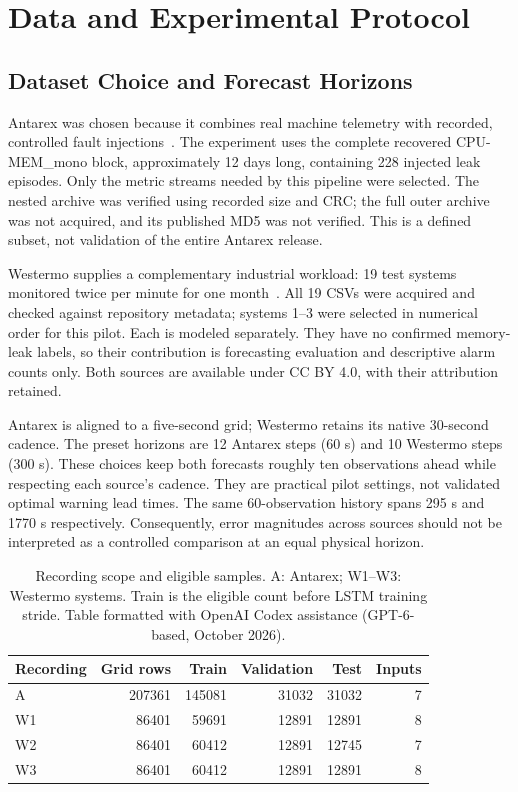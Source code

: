 \documentclass{llncs}
\begin{document}
\section{Data and Experimental Protocol}
\subsection{Dataset Choice and Forecast Horizons}
Antarex was chosen because it combines real machine telemetry with recorded, controlled fault injections~\cite{ref3,ref4,ref5}. The experiment uses the complete recovered CPU-MEM\_mono block, approximately 12 days long, containing 228 injected leak episodes. Only the metric streams needed by this pipeline were selected. The nested archive was verified using recorded size and CRC; the full outer archive was not acquired, and its published MD5 was not verified. This is a defined subset, not validation of the entire Antarex release.

Westermo supplies a complementary industrial workload: 19 test systems monitored twice per minute for one month~\cite{ref6}. All 19 CSVs were acquired and checked against repository metadata; systems 1--3 were selected in numerical order for this pilot. Each is modeled separately. They have no confirmed memory-leak labels, so their contribution is forecasting evaluation and descriptive alarm counts only. Both sources are available under CC BY 4.0, with their attribution retained.

Antarex is aligned to a five-second grid; Westermo retains its native 30-second cadence. The preset horizons are 12 Antarex steps (60 s) and 10 Westermo steps (300 s). These choices keep both forecasts roughly ten observations ahead while respecting each source's cadence. They are practical pilot settings, not validated optimal warning lead times. The same 60-observation history spans 295 s and 1770 s respectively. Consequently, error magnitudes across sources should not be interpreted as a controlled comparison at an equal physical horizon.

\begin{table}[htbp]
\caption{Recording scope and eligible samples. A: Antarex; W1--W3: Westermo systems. Train is the eligible count before LSTM training stride. Table formatted with OpenAI Codex assistance (GPT-6-based, October 2026).}
\label{tab:data}
\centering\small
\setlength{\tabcolsep}{5pt}
\begin{tabular}{@{}lrrrrr@{}}
\toprule
Recording & Grid rows & Train & Validation & Test & Inputs\\
\midrule
A &207361&145081&31032&31032&7\\
W1&86401&59691&12891&12891&8\\
W2&86401&60412&12891&12745&7\\
W3&86401&60412&12891&12891&8\\
\bottomrule
\end{tabular}
\end{table}
\end{document}
